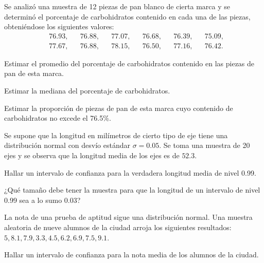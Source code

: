 \documentclass[a4paper,oneside,fleqn,11pt]{article}
\begin{document}
\maketitle

\begin{ejercicios}

\item
Se analizó una muestra de 12 piezas de pan blanco de cierta marca y se
determinó el porcentaje de carbohidratos contenido en cada una de las piezas,
obteniéndose los siguientes valores:
\begin{align*}
  & 76.93, && 76.88, && 77.07, && 76.68, && 76.39, && 75.09, \\ 
  & 77.67, && 76.88, && 78.15, && 76.50, && 77.16, && 76.42.
\end{align*}

\begin{ejitems}
    \item Estimar el promedio del porcentaje de carbohidratos contenido en las
piezas de pan de esta marca.
    
    \item Estimar la mediana del porcentaje de carbohidratos.
    
    \item Estimar la proporción de piezas de pan de esta marca cuyo contenido
de carbohidratos no excede el 76.5\%.
\end{ejitems}

\item
Se supone que la longitud en milímetros de cierto tipo de eje tiene una
distribución normal con desvío estándar $\sigma = 0.05$. Se toma una muestra
de 20 ejes y se observa que la longitud media de los ejes es de $52.3$.
\begin{ejitems}
  \item Hallar un intervalo de confianza para la verdadera longitud media de
nivel 0.99.
    
  \item ¿Qué tamaño debe tener la muestra para que la longitud de un
intervalo de nivel 0.99 sea a lo sumo 0.03?
\end{ejitems}


\item
La nota de una prueba de aptitud sigue una distribución normal. Una muestra aleatoria de nueve alumnos de la ciudad arroja los siguientes resultados: $5, 8.1, 7.9, 3.3, 4.5, 6.2, 6.9, 7.5, 9.1$.

\begin{ejitems}
    \item Hallar un intervalo de confianza para la nota media de los alumnos de la ciudad.
    

\end{ejitems}
\end{ejercicios}
\end{document}
